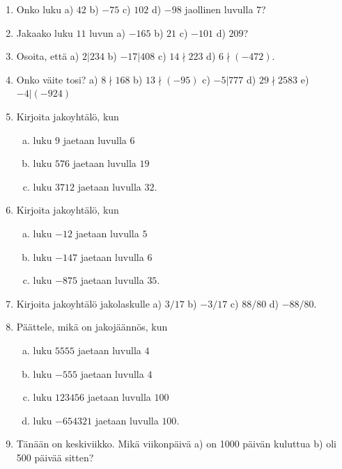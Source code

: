 \begin{enumerate}

\item Onko luku a) $42$ b) $-75$ c) $102$ d) $-98$ jaollinen luvulla $7$?

\item Jakaako luku $11$ luvun a) $-165$ b) $21$ c) $-101$ d) $209$?

\item Osoita, että a) $2|234$ b) $-17|408$ c) $14 \nmid 223$ d) $6 \nmid (-472)$.

\item Onko väite tosi? a) $8 \nmid 168$ b) $13 \nmid (-95)$ c) $-5|777$ d) $29\nmid 2583$ e) $-4|(-924)$

\newpage

\item Kirjoita jakoyhtälö, kun
\begin{enumerate}[a)]
\item luku $9$ jaetaan luvulla $6$
\item luku $576$ jaetaan luvulla $19$
\item luku $3712$ jaetaan luvulla $32$.
\end{enumerate}

\item Kirjoita jakoyhtälö, kun
\begin{enumerate}[a)]
\item luku $-12$ jaetaan luvulla $5$
\item luku $-147$ jaetaan luvulla $6$
\item luku $-875$ jaetaan luvulla $35$.
\end{enumerate}

\item Kirjoita jakoyhtälö jakolaskulle a) $3/17$ b) $-3/17$ c) $88/80$ d) $-88/80$.

\item Päättele, mikä on jakojäännös, kun
\begin{enumerate}[a)]
\item luku $5555$ jaetaan luvulla $4$
\item luku $-555$ jaetaan luvulla $4$
\item luku $123456$ jaetaan luvulla $100$
\item luku $-654321$ jaetaan luvulla $100$.
\end{enumerate}

\item Tänään on keskiviikko. Mikä viikonpäivä a) on 1000 päivän kuluttua b) oli 500 päivää sitten?


\end{enumerate}

